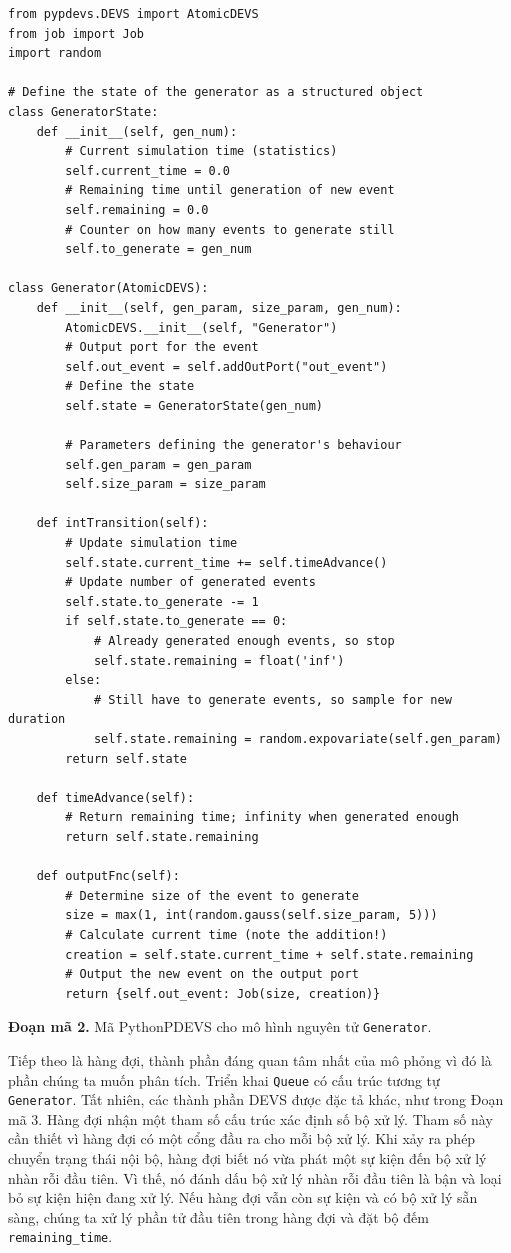 \begin{verbatim}
from pypdevs.DEVS import AtomicDEVS
from job import Job
import random

# Define the state of the generator as a structured object
class GeneratorState:
    def __init__(self, gen_num):
        # Current simulation time (statistics)
        self.current_time = 0.0
        # Remaining time until generation of new event
        self.remaining = 0.0
        # Counter on how many events to generate still
        self.to_generate = gen_num

class Generator(AtomicDEVS):
    def __init__(self, gen_param, size_param, gen_num):
        AtomicDEVS.__init__(self, "Generator")
        # Output port for the event
        self.out_event = self.addOutPort("out_event")
        # Define the state
        self.state = GeneratorState(gen_num)

        # Parameters defining the generator's behaviour
        self.gen_param = gen_param
        self.size_param = size_param

    def intTransition(self):
        # Update simulation time
        self.state.current_time += self.timeAdvance()
        # Update number of generated events
        self.state.to_generate -= 1
        if self.state.to_generate == 0:
            # Already generated enough events, so stop
            self.state.remaining = float('inf')
        else:
            # Still have to generate events, so sample for new duration
            self.state.remaining = random.expovariate(self.gen_param)
        return self.state

    def timeAdvance(self):
        # Return remaining time; infinity when generated enough
        return self.state.remaining

    def outputFnc(self):
        # Determine size of the event to generate
        size = max(1, int(random.gauss(self.size_param, 5)))
        # Calculate current time (note the addition!)
        creation = self.state.current_time + self.state.remaining
        # Output the new event on the output port
        return {self.out_event: Job(size, creation)}
\end{verbatim}
\noindent\textbf{Đoạn mã 2.} Mã PythonPDEVS cho mô hình nguyên tử \texttt{Generator}.

Tiếp theo là hàng đợi, thành phần đáng quan tâm nhất của mô phỏng vì đó là phần chúng ta muốn phân tích. Triển khai \texttt{Queue} có cấu trúc tương tự \texttt{Generator}. Tất nhiên, các thành phần DEVS được đặc tả khác, như trong Đoạn mã 3. Hàng đợi nhận một tham số cấu trúc xác định số bộ xử lý. Tham số này cần thiết vì hàng đợi có một cổng đầu ra cho mỗi bộ xử lý. Khi xảy ra phép chuyển trạng thái nội bộ, hàng đợi biết nó vừa phát một sự kiện đến bộ xử lý nhàn rỗi đầu tiên. Vì thế, nó đánh dấu bộ xử lý nhàn rỗi đầu tiên là bận và loại bỏ sự kiện hiện đang xử lý. Nếu hàng đợi vẫn còn sự kiện và có bộ xử lý sẵn sàng, chúng ta xử lý phần tử đầu tiên trong hàng đợi và đặt bộ đếm \texttt{remaining\_time}.

